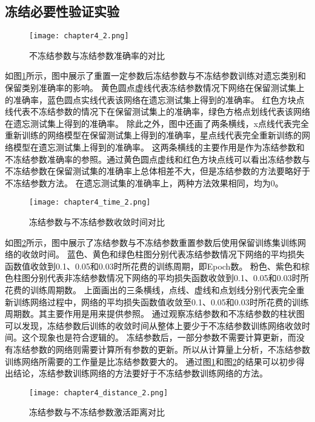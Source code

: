\subsection{冻结必要性验证实验}
\begin{figure}
    \centering
    \texttt{[image: chapter4\_2.png]}
    \caption{不冻结参数与冻结参数准确率的对比}
    \label{fig:chapter4_2}
\end{figure}

如图\ref{fig:chapter4_2}所示，图中展示了重置一定参数后冻结参数与不冻结参数训练对遗忘类别和保留类别准确率的影响。
黄色圆点虚线代表冻结参数情况下网络在保留测试集上的准确率，蓝色圆点实线代表该网络在遗忘测试集上得到的准确率。
红色方块点线代表不冻结参数的情况下在保留测试集上的准确率，绿色方格点划线代表该网络在遗忘测试集上得到的准确率。
除此之外，图中还画了两条横线，x点线代表完全重新训练的网络模型在保留测试集上得到的准确率，星点线代表完全重新训练的网络模型在遗忘测试集上得到的准确率。
这两条横线的主要作用是作为冻结参数和不冻结参数准确率的参照。通过黄色圆点虚线和红色方块点线可以看出冻结参数与不冻结参数在保留测试集的准确率上总体相差不大，但是冻结参数的方法要略好于不冻结参数方法。
在遗忘测试集的准确率上，两种方法效果相同，均为0。
\begin{figure}
    \centering
    \texttt{[image: chapter4\_time\_2.png]}
    \caption{冻结参数与不冻结参数收敛时间对比}
    \label{fig:chapter4_time_2}
\end{figure}

如图\ref{fig:chapter4_time_2}所示，图中展示了冻结参数与不冻结参数重置参数后使用保留训练集训练网络的收敛时间。
蓝色、黄色和绿色柱图分别代表冻结参数情况下网络的平均损失函数值收敛到0.1、0.05和0.03时所花费的训练周期，即Epoch数。
粉色、紫色和棕色柱图分别代表非冻结参数情况下网络的平均损失函数收敛到0.1、0.05和0.03时所花费的训练周期数。
上面画出的三条横线，点线、虚线和点划线分别代表完全重新训练网络过程中，网络的平均损失函数值收敛至0.1、0.05和0.03时所花费的训练周期数。其主要作用是用来提供参照。
通过观察冻结参数和不冻结参数的柱状图可以发现，冻结参数后训练的收敛时间从整体上要少于不冻结参数训练网络收敛时间。这个现象也是符合逻辑的。
冻结参数后，一部分参数不需要计算更新，而没有冻结参数的网络则需要计算所有参数的更新。所以从计算量上分析，不冻结参数训练网络所需要的工作量是比冻结参数要大的。
通过图\ref{fig:chapter4_2}和图\ref{fig:chapter4_time_2}的结果可以初步得出结论，冻结参数训练网络的方法要好于不冻结参数训练网络的方法。
\begin{figure}
    \centering
    \texttt{[image: chapter4\_distance\_2.png]}
    \caption{冻结参数与不冻结参数激活距离对比}
    \label{fig:chapter4_distance_2}
\end{figure}

